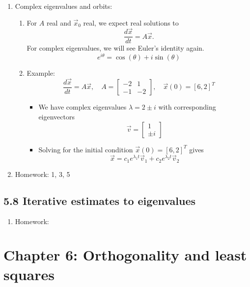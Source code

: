 \documentclass{article}
\begin{document}
\begin{enumerate}
\item Complex eigenvalues and orbits:
\begin{enumerate}
\item For $A$ real and $\vec{x}_0$ real, we expect real solutions to 
\[
\frac{d \vec{x}}{dt} = A \vec{x}.
\]
For complex eigenvalues, we will see Euler's identity again.
\[
e^{i \theta} = \cos(\theta) + i \sin(\theta)
\]
\item Example: 
\[
\frac{d \vec{x}}{dt} = A \vec{x}, \quad A = \left[
\begin{array}{cc}
-2 & 1 \\
-1 & -2
\end{array}
\right], \quad \vec{x}(0) = [6, 2]^T
\]
\begin{itemize}
\item We have complex eigenvalues $\lambda =2 \pm i$ with corresponding eigenvectors
\[
\vec{v} = \left[ 
\begin{array}{c}
1 \\ \pm i
\end{array} \right]
\]
\item Solving for the initial condition $\vec{x}(0) = [6,2]^T$ gives
\[
\vec{x} = c_1 e^{\lambda_1 t} \vec{v}_1 + c_2 e^{\lambda_2 t} \vec{v}_2
\]
\end{itemize}
\end{enumerate}

\item Homework: 1, 3, 5

\end{enumerate}

\subsection{5.8 Iterative estimates to eigenvalues}

\begin{enumerate}

\item Homework: 

\end{enumerate}

\section{Chapter 6: Orthogonality and least squares} 
\end{document}
